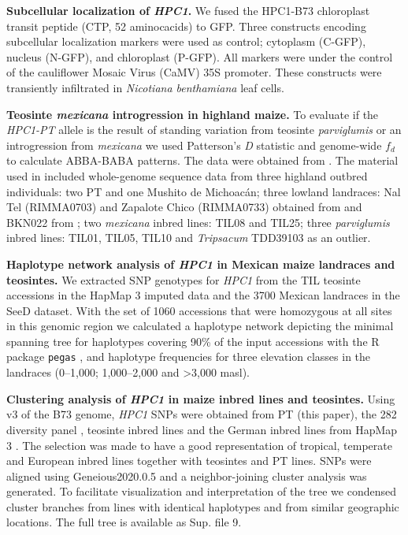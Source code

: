\documentclass[9pt,twocolumn,twoside,lineno]{biorxiv}
\def\code#1{\texttt{#1}}
\newcommand{\mex}{\textit{mexicana}\xspace}
\newcommand{\hpc}{\textit{HPC1}\xspace}
\newcommand{\parv}{\textit{parviglumis}\xspace}
\begin{document}
\textbf{Subcellular localization of \hpc.}
We fused the HPC1-B73 chloroplast transit peptide (CTP, 52 aminocacids) to GFP. 
Three constructs encoding subcellular localization markers were used as control; cytoplasm (C-GFP), nucleus (N-GFP), and chloroplast (P-GFP).
All markers were under the control of the cauliflower Mosaic Virus (CaMV) 35S promoter. 
These constructs were transiently infiltrated in \textit{Nicotiana benthamiana} leaf cells.

\textbf{Teosinte \mex introgression in highland maize.}
To evaluate if the \textit{HPC1-PT} allele is the result of standing variation from teosinte \parv or an introgression from \mex we used Patterson's \textit{D} statistic and genome-wide $f_{d}$ to calculate ABBA-BABA patterns. 
The data were obtained from \cite{Gonzalez-Segovia2019-jy}. 
The material used in \cite{Gonzalez-Segovia2019-jy} included whole-genome sequence data from three highland outbred individuals: two PT and one Mushito de Michoacán; three lowland landraces: Nal Tel (RIMMA0703) and Zapalote Chico (RIMMA0733) obtained from \cite{Wang2017-bc} and  BKN022 from \cite{Bukowski2017-ng}; two \mex inbred lines: TIL08 and TIL25; three \parv inbred lines: TIL01, TIL05, TIL10 and \textit{Tripsacum} TDD39103 \cite{Bukowski2017-ng} as an outlier. 

\textbf{Haplotype network analysis of \hpc in Mexican maize landraces and teosintes.}
We extracted SNP genotypes for \hpc from the TIL teosinte accessions in the HapMap 3 imputed data \cite{Bukowski2017-ng} and the 3700 Mexican landraces in the SeeD dataset. 
With the set of 1060 accessions that were homozygous at all sites in this genomic region we calculated a haplotype network depicting the minimal spanning tree for haplotypes covering 90\% of the input accessions with the R package \code{pegas} \cite{paradis2010}, and haplotype frequencies for three elevation classes in the landraces (0--1,000; 1,000--2,000 and >3,000 masl).

\textbf{Clustering analysis of \hpc in maize inbred lines and teosintes.}
Using v3 of the B73 genome, \hpc SNPs were obtained from PT (this paper), the 282 diversity panel \cite{Flint-Garcia2005-hb}, teosinte inbred lines and the German inbred lines from HapMap 3 \cite{Bukowski2017-ng}. 
The selection was made to have a good representation of tropical, temperate and European inbred lines together with teosintes and PT lines.
SNPs were aligned using Geneious2020.0.5 and a neighbor-joining cluster analysis was generated. 
To facilitate visualization and interpretation of the tree we condensed cluster branches from lines with identical haplotypes and from similar geographic locations. 
The full tree is available as Sup. file 9. 
\end{document}
